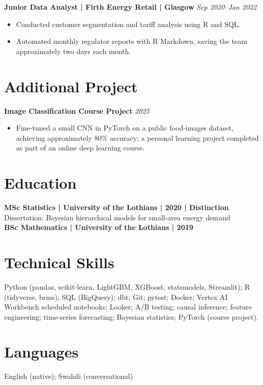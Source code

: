 \documentclass[11pt,a4paper]{article}
\begin{document}
\textbf{Junior Data Analyst | Firth Energy Retail | Glasgow} \hfill \textit{Sep 2020–Jan 2022}
\begin{itemize}
\item Conducted customer segmentation and tariff analysis using R and SQL.
\item Automated monthly regulator reports with R Markdown, saving the team approximately two days each month.
\end{itemize}

\section*{Additional Project}
\textbf{Image Classification Course Project} \hfill \textit{2025}
\begin{itemize}
\item Fine-tuned a small CNN in PyTorch on a public food-images dataset, achieving approximately 80\% accuracy; a personal learning project completed as part of an online deep learning course.
\end{itemize}

\section*{Education}
\textbf{MSc Statistics | University of the Lothians | 2020 | Distinction}\\
Dissertation: Bayesian hierarchical models for small-area energy demand\\[0.35em]
\textbf{BSc Mathematics | University of the Lothians | 2019}

\section*{Technical Skills}
Python (pandas, scikit-learn, LightGBM, XGBoost, statsmodels, Streamlit); R (tidyverse, brms); SQL (BigQuery); dbt; Git; pytest; Docker; Vertex AI Workbench scheduled notebooks; Looker; A/B testing; causal inference; feature engineering; time-series forecasting; Bayesian statistics; PyTorch (course project).

\section*{Languages}
English (native); Swahili (conversational)
\end{document}
